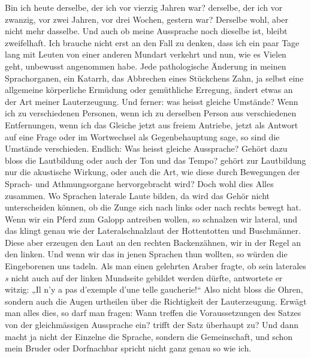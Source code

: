 {Bin ich heute derselbe, der ich vor vierzig Jahren war? derselbe, der ich vor zwanzig, vor zwei Jahren, vor drei Wochen, gestern war? Derselbe wohl, aber nicht mehr dasselbe. Und auch ob meine Aussprache noch dieselbe ist, bleibt zweifelhaft. Ich brauche nicht erst an den Fall zu denken, dass ich ein paar Tage lang mit Leuten von einer anderen Mundart verkehrt und nun, wie es Vielen geht, unbewusst  angenommen habe. Jede pathologische Änderung in meinen Sprachorganen, ein Katarrh, das Abbrechen eines Stückchens Zahn, ja selbst eine allgemeine körperliche Ermüdung oder gemüthliche Erregung, ändert etwas an der Art meiner Lauterzeugung. Und ferner: was heisst gleiche Umstände? Wenn ich zu verschiedenen Personen, \label{fp.198} wenn ich zu derselben Person aus verschiedenen Entfernungen, wenn ich das Gleiche jetzt aus freiem Antriebe, jetzt als Antwort auf eine Frage oder im Wortwechsel als Gegenbehauptung sage, so sind die Umstände verschieden. Endlich: Was heisst gleiche Aussprache? Gehört dazu bloss die Lautbildung oder auch der Ton und das Tempo? gehört zur Lautbildung nur die akustische Wirkung, oder auch die Art, wie diese durch Bewegungen der Sprach- und Athmungsorgane hervorgebracht wird? Doch wohl dies Alles zusammen. Wo Sprachen laterale Laute bilden, da wird das Gehör nicht unterscheiden können, ob die Zunge sich nach links oder nach rechts bewegt hat. Wenn wir ein Pferd zum Galopp antreiben wollen, so schnalzen wir lateral, und das klingt genau wie der Lateralschnalzlaut der Hottentotten und Buschmänner. Diese aber erzeugen den Laut an den rechten Backenzähnen, wir in der Regel an den linken. Und wenn wir das in jenen Sprachen thun wollten, so würden die Eingeborenen uns tadeln. Als man einen gelehrten Araber fragte, ob sein laterales \textit{s} nicht auch auf der linken Mundseite gebildet werden dürfte, antwortete er witzig: „Il n’y a pas d’exemple d’une telle gaucherie!“ Also nicht bloss die Ohren, sondern auch die Augen urtheilen über die Richtigkeit der Lauterzeugung. Erwägt man alles dies, so darf man fragen: Wann treffen die Voraussetzungen des Satzes von der gleichmässigen Aus\-sprache ein? trifft der Satz überhaupt zu? Und dann macht ja nicht der Einzelne die Sprache, sondern die Gemeinschaft, und schon mein Bruder oder Dorfnachbar spricht nicht ganz genau so wie ich.

}
